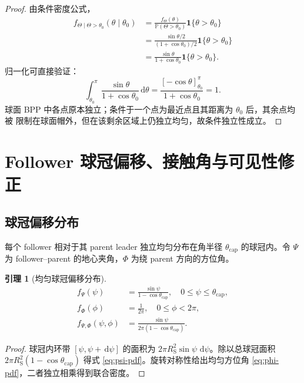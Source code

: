 \documentclass[UTF8,a4paper,11pt]{ctexart}
\newtheorem{lemma}{引理}[section]
\newcommand{\Prob}{\mathbb P}
\newcommand{\dd}{\,\mathrm d}
\newcommand{\ind}{\mathbf 1}
\newcommand{\Rsat}{R_{\mathrm S}}
\newcommand{\thetac}{\theta_{\mathrm{cap}}}
\begin{document}
\begin{proof}
由条件密度公式，
\begin{equation}
\begin{split}
 f_{\Theta\mid\Theta>\theta_0}(\theta\mid\theta_0)
 &=
 \frac{f_{\Theta}(\theta)}
 {\Prob(\Theta>\theta_0)}\ind\{\theta>\theta_0\}\\
 &=
 \frac{\sin\theta/2}{(1+\cos\theta_0)/2}
 \ind\{\theta>\theta_0\}\\
 &=
 \frac{\sin\theta}{1+\cos\theta_0}
 \ind\{\theta>\theta_0\}.
\end{split}
\end{equation}
归一化可直接验证：
\begin{equation}
 \int_{\theta_0}^{\pi}
 \frac{\sin\theta}{1+\cos\theta_0}\dd\theta
 =
 \frac{[-\cos\theta]_{\theta_0}^{\pi}}{1+\cos\theta_0}
 =1.
\end{equation}
球面 BPP 中各点原本独立；条件于一个点为最近点且其距离为 $\theta_0$ 后，其余点均被
限制在球面帽外，但在该剩余区域上仍独立均匀，故条件独立性成立。
\end{proof}

\section{Follower 球冠偏移、接触角与可见性修正}

\subsection{球冠偏移分布}

每个 follower 相对于其 parent leader 独立均匀分布在角半径 $\thetac$ 的球冠内。令
$\Psi$ 为 follower--parent 的地心夹角，$\Phi$ 为绕 parent 方向的方位角。

\begin{lemma}[均匀球冠偏移分布]
\begin{align}
 f_{\Psi}(\psi)
 &=\frac{\sin\psi}{1-\cos\thetac},
 \quad 0\leq\psi\leq\thetac,\label{eq:psi-pdf}\\
 f_{\Phi}(\phi)&=\frac{1}{2\pi},
 \quad 0\leq\phi<2\pi,\label{eq:phi-pdf}\\
 f_{\Psi,\Phi}(\psi,\phi)
 &=\frac{\sin\psi}{2\pi(1-\cos\thetac)}.
 \label{eq:offset-joint-pdf}
\end{align}
\end{lemma}

\begin{proof}
球冠内环带 $[\psi,\psi+\dd\psi]$ 的面积为
$2\pi\Rsat^2\sin\psi\,\dd\psi$。除以总球冠面积
$2\pi\Rsat^2(1-\cos\thetac)$ 得式 \eqref{eq:psi-pdf}。旋转对称性给出均匀方位角
\eqref{eq:phi-pdf}，二者独立相乘得到联合密度。
\end{proof}
\end{document}
